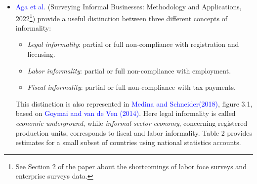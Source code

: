 \documentclass[letterpaper, 12pt]{article}
\begin{document}
\begin{itemize}
\begin{itemize}
        \item \textcolor{red}{UPDATE Jan 2025: merged dataset WBES standard-micro-informal for 14 countries}
        \item If I exclude the observations from regions that are not in the informal data, I'll probably halve the size of the formal database. Not sure whether this is needed for representativeness; check documentation and other papers
        \item All the observations are weighted. But are weights comparable across standard and informal data? what are they representative of? check documentation and other papers. 
        \textcolor{red}{Update, Jan 2025: Contacted WBES by email, suggested comparability for employment and sales, not for value added. However, informality looks to be smaller than in the ILO data. Indian WBES data somewhat overrpresent micro formal.}
    \end{itemize}
    \item \textcolor{blue}{Aga et al.} (Surveying Informal Businesses: Methodology and Applications, 2022\footnote{See Section 2 of the paper about the shortcomings of labor foce surveys and enterprise surveys data.}) provide a useful distinction between three different concepts of informality:
    \begin{itemize}
        \item \textit{Legal informality}: partial or full non-compliance with registration and licensing.
        \item \textit{Labor informality}: partial or full non-compliance with employment.
        \item \textit{Fiscal informality}: partial or full non-compliance with tax payments.
    \end{itemize}
    This distinction is also represented in \textcolor{blue}{Medina and Schneider(2018)}, figure 3.1, based on \textcolor{blue}{Goymai and van de Ven (2014)}. Here legal informality is called \textit{economic underground}, while \textit{informal sector economy}, concerning registered production units, corresponds to fiscal and labor informality. Table 2 provides estimates for a small subset of countries using national statistics accounts.


\end{itemize}
\end{document}
